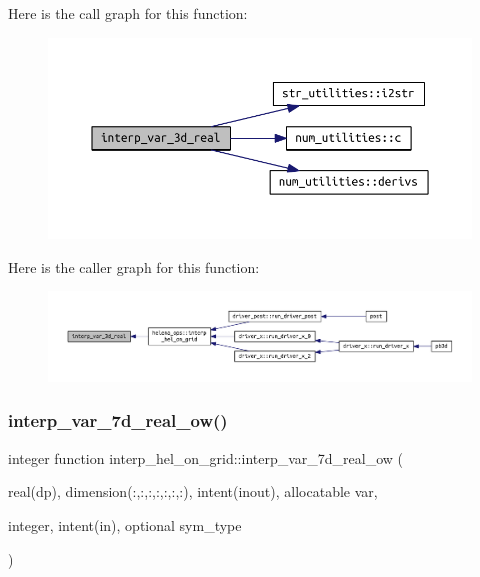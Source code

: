 Here is the call graph for this function\+:
\nopagebreak
\begin{figure}[H]
\begin{center}
\leavevmode
\includegraphics[width=350pt]{HELENA__ops_8f90_a0480c2cb24b13d76286e1f2b0fe100a1_cgraph}
\end{center}
\end{figure}
Here is the caller graph for this function\+:
\nopagebreak
\begin{figure}[H]
\begin{center}
\leavevmode
\includegraphics[width=350pt]{HELENA__ops_8f90_a0480c2cb24b13d76286e1f2b0fe100a1_icgraph}
\end{center}
\end{figure}
\mbox{\label{HELENA__ops_8f90_a8229f4b89831a39793047106375555cf}} 
\subsubsection{\texorpdfstring{interp\+\_\+var\+\_\+7d\+\_\+real\+\_\+ow()}{interp\_var\_7d\_real\_ow()}}
{\footnotesize\ttfamily integer function interp\+\_\+hel\+\_\+on\+\_\+grid\+::interp\+\_\+var\+\_\+7d\+\_\+real\+\_\+ow (\begin{DoxyParamCaption}\item[{real(dp), dimension(\+:,\+:,\+:,\+:,\+:,\+:,\+:), intent(inout), allocatable}]{var,  }\item[{integer, intent(in), optional}]{sym\+\_\+type }\end{DoxyParamCaption})}



